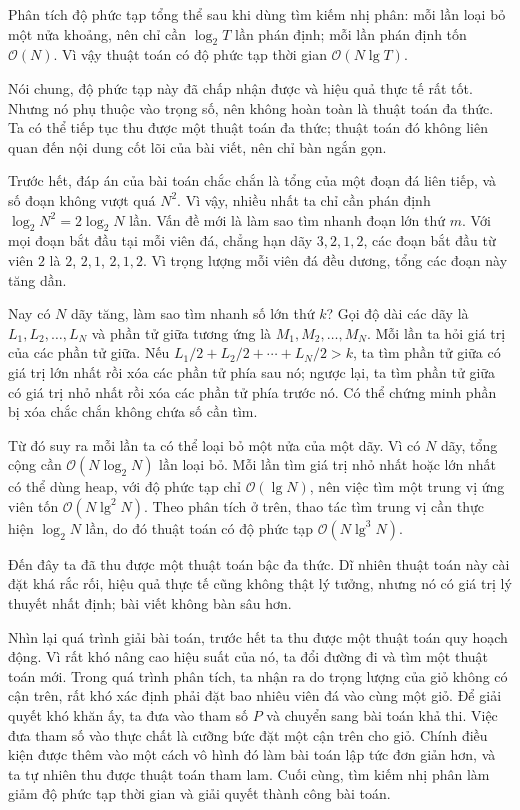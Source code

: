 \documentclass[11pt]{article}
\newcommand{\Oh}{\mathcal{O}}
\begin{document}
Phân tích độ phức tạp tổng thể sau khi dùng tìm kiếm nhị phân: mỗi lần loại
bỏ một nửa khoảng, nên chỉ cần $\log_2 T$ lần phán định; mỗi lần phán định tốn
$\Oh(N)$. Vì vậy thuật toán có độ phức tạp thời gian $\Oh(N\lg T)$.

Nói chung, độ phức tạp này đã chấp nhận được và hiệu quả thực tế rất tốt.
Nhưng nó phụ thuộc vào trọng số, nên không hoàn toàn là thuật toán đa thức. Ta
có thể tiếp tục thu được một thuật toán đa thức; thuật toán đó không liên quan
đến nội dung cốt lõi của bài viết, nên chỉ bàn ngắn gọn.

Trước hết, đáp án của bài toán chắc chắn là tổng của một đoạn đá liên tiếp, và
số đoạn không vượt quá $N^2$. Vì vậy, nhiều nhất ta chỉ cần phán định
$\log_2 N^2=2\log_2 N$ lần. Vấn đề mới là làm sao tìm nhanh đoạn lớn thứ $m$.
Với mọi đoạn bắt đầu tại mỗi viên đá, chẳng hạn dãy $3,2,1,2$, các đoạn bắt
đầu từ viên $2$ là $2$, $2,1$, $2,1,2$. Vì trọng lượng mỗi viên đá đều dương,
tổng các đoạn này tăng dần.

Nay có $N$ dãy tăng, làm sao tìm nhanh số lớn thứ $k$? Gọi độ dài các dãy là
$L_1,L_2,\ldots,L_N$ và phần tử giữa tương ứng là
$M_1,M_2,\ldots,M_N$. Mỗi lần ta hỏi giá trị của các phần tử giữa. Nếu
$L_1/2+L_2/2+\cdots+L_N/2>k$, ta tìm phần tử giữa có giá trị lớn nhất rồi xóa
các phần tử phía sau nó; ngược lại, ta tìm phần tử giữa có giá trị nhỏ nhất
rồi xóa các phần tử phía trước nó. Có thể chứng minh phần bị xóa chắc chắn
không chứa số cần tìm.

Từ đó suy ra mỗi lần ta có thể loại bỏ một nửa của một dãy. Vì có $N$ dãy,
tổng cộng cần $\Oh(N\log_2 N)$ lần loại bỏ. Mỗi lần tìm giá trị nhỏ nhất hoặc
lớn nhất có thể dùng heap, với độ phức tạp chỉ $\Oh(\lg N)$, nên việc tìm một
trung vị ứng viên tốn $\Oh(N\lg^2 N)$. Theo phân tích ở trên, thao tác tìm
trung vị cần thực hiện $\log_2 N$ lần, do đó thuật toán có độ phức tạp
$\Oh(N\lg^3 N)$.

Đến đây ta đã thu được một thuật toán bậc đa thức. Dĩ nhiên thuật toán này cài
đặt khá rắc rối, hiệu quả thực tế cũng không thật lý tưởng, nhưng nó có giá
trị lý thuyết nhất định; bài viết không bàn sâu hơn.

Nhìn lại quá trình giải bài toán, trước hết ta thu được một thuật toán quy
hoạch động. Vì rất khó nâng cao hiệu suất của nó, ta đổi đường đi và tìm một
thuật toán mới. Trong quá trình phân tích, ta nhận ra do trọng lượng của giỏ
không có cận trên, rất khó xác định phải đặt bao nhiêu viên đá vào cùng một
giỏ. Để giải quyết khó khăn ấy, ta đưa vào tham số $P$ và chuyển sang bài
toán khả thi. Việc đưa tham số vào thực chất là cưỡng bức đặt một cận trên cho
giỏ. Chính điều kiện được thêm vào một cách vô hình đó làm bài toán lập tức
đơn giản hơn, và ta tự nhiên thu được thuật toán tham lam. Cuối cùng, tìm kiếm
nhị phân làm giảm độ phức tạp thời gian và giải quyết thành công bài toán.
\end{document}
